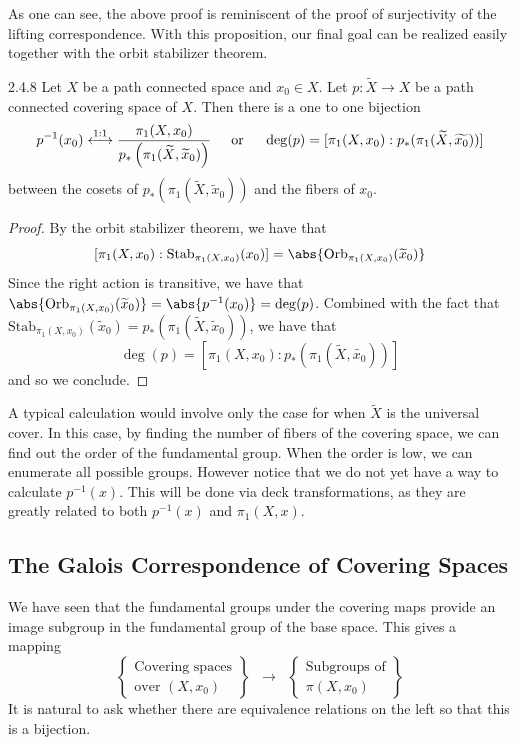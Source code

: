 \documentclass[a4paper]{article}
\begin{document}
As one can see, the above proof is reminiscent of the proof of surjectivity of the lifting correspondence. With this proposition, our final goal can be realized easily together with the orbit stabilizer theorem. 

\begin{thm}{}{2.4.8} Let $X$ be a path connected space and $x_0\in X$. Let $p:\widetilde{X}\to X$ be a path connected covering space of $X$. Then there is a one to one bijection $$p^{-1}(x_0)\overset{\text{1:1}}{\longleftrightarrow}\frac{\pi_1(X,x_0)}{p_\ast\left(\pi_1(\widetilde{X},\widetilde{x}_0)\right)}\text{\;\;\;\; or \;\;\;\;}\deg(p)=[\pi_1(X,x_0):p_\ast(\pi_1(\widetilde{X},\widetilde{x_0}))]$$ between the cosets of $p_\ast\left(\pi_1(\widetilde{X},\widetilde{x}_0)\right)$ and the fibers of $x_0$. 
\begin{proof}
By the orbit stabilizer theorem, we have that $$[\pi_1(X,x_0):\text{Stab}_{\pi_1(X,x_0)}(x_0)]=\abs{\text{Orb}_{\pi_1(X,x_0)}(\widetilde{x}_0)}$$ Since the right action is transitive, we have that $\abs{\text{Orb}_{\pi_1(X,x_0)}(\widetilde{x}_0)}=\abs{p^{-1}(x_0)}=\deg(p)$. Combined with the fact that $\text{Stab}_{\pi_1(X,x_0)}(\widetilde{x}_0)=p_\ast\left(\pi_1(\widetilde{X},\widetilde{x}_0)\right)$, we have that $$\deg(p)=[\pi_1(X,x_0):p_\ast(\pi_1(\widetilde{X},\widetilde{x_0}))]$$ and so we conclude. 
\end{proof}
\end{thm}

A typical calculation would involve only the case for when $\widetilde{X}$ is the universal cover. In this case, by finding the number of fibers of the covering space, we can find out the order of the fundamental group. When the order is low, we can enumerate all possible groups. However notice that we do not yet have a way to calculate $p^{-1}(x)$. This will be done via deck transformations, as they are greatly related to both $p^{-1}(x)$ and $\pi_1(X,x)$. 

\subsection{The Galois Correspondence of Covering Spaces}
We have seen that the fundamental groups under the covering maps provide an image subgroup in the fundamental group of the base space. This gives a mapping $$\left\{\substack{\text{Covering spaces}\\\text{over }(X,x_0)}\right\}\;\;\longrightarrow\;\;\left\{\substack{\text{Subgroups of}\\ \pi(X,x_0)}\right\}$$ It is natural to ask whether there are equivalence relations on the left so that this is a bijection. 
\end{document}
